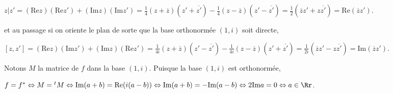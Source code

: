 {\begin{enumerate}
{\begin{center}
$z|z'= (\text{Re}z)(\text{Re}z')+(\text{Im}z)(\text{Im}z') =\frac{1}{4}(z+\overline{z})(z'+\overline{z'})-\frac{1}{4}(z-\overline{z})(z'-\overline{z'})=\frac{1}{2}(\overline{z}z'+z\overline{z'}) =\text{Re}(\overline{z}z')$.
\end{center}

et au passage si on oriente le plan de sorte que la base orthonormée $(1,i)$ soit directe,

\begin{center}
$[z,z']= (\text{Re}z)(\text{Im}z')+(\text{Im}z)(\text{Re}z') =\frac{1}{4i}(z+\overline{z})(z'-\overline{z'})-\frac{1}{4i}(z-\overline{z})(z'+\overline{z'})=\frac{1}{2i}(\overline{z}z'-z\overline{z'}) =\text{Im}(\overline{z}z')$.
\end{center}

Notons $M$ la matrice de $f$ dans la base $(1,i)$. Puisque la base $(1,i)$ est orthonormée,

\begin{center}
$f = f^*\Leftrightarrow M ={^t}M\Leftrightarrow\text{Im}(a+b) =\text{Re}(i(a-b))\Leftrightarrow\text{Im}(a+b) =-\text{Im}(a-b)\Leftrightarrow2\text{Im}a = 0\Leftrightarrow a\in\Rr$.
\end{center}

\begin{center}
\end{center}}
\end{enumerate}
}

